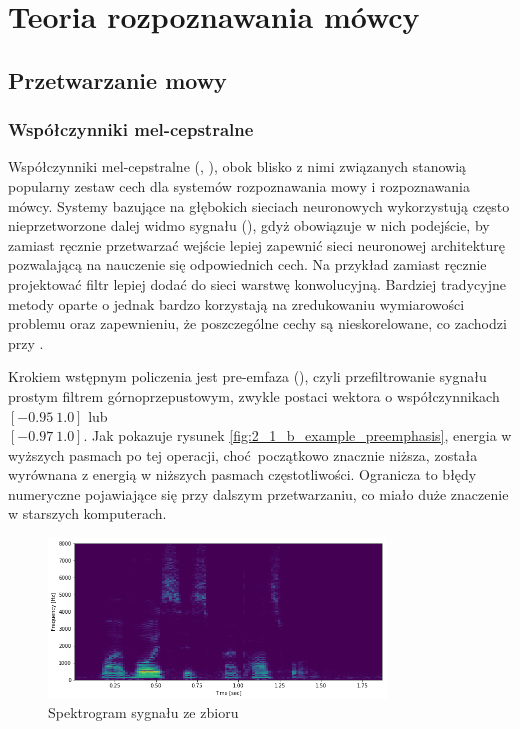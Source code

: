 \chapter{Teoria rozpoznawania mówcy}\label{chap:teoria}

\section{Przetwarzanie mowy}\label{sec:przetwarzanie_mowy}

\subsection{Współczynniki mel-cepstralne}\label{sec:mfcc}

Współczynniki mel-cepstralne (, ),
obok blisko z nimi związanych  stanowią popularny zestaw
cech dla systemów rozpoznawania mowy i rozpoznawania mówcy. Systemy bazujące na głębokich sieciach
neuronowych wykorzystują często nieprzetworzone dalej widmo sygnału (), gdyż obowiązuje
w nich podejście, by zamiast ręcznie przetwarzać wejście lepiej zapewnić sieci neuronowej
architekturę pozwalającą na nauczenie się odpowiednich cech. Na przykład zamiast ręcznie
projektować filtr lepiej dodać do sieci warstwę konwolucyjną. Bardziej tradycyjne metody
oparte o  jednak bardzo korzystają na zredukowaniu wymiarowości problemu
oraz zapewnieniu, że poszczególne cechy są nieskorelowane, co zachodzi przy .

Krokiem wstępnym policzenia  jest pre-emfaza (), czyli przefiltrowanie sygnału
prostym filtrem górnoprzepustowym, zwykle postaci wektora o współczynnikach $[-0.95\ 1.0]$ lub \\ $[-0.97\ 1.0]$.
Jak pokazuje rysunek \ref{fig:2_1_b_example_preemphasis}, energia w wyższych pasmach po tej operacji,
choć początkowo znacznie niższa, została wyrównana z energią w niższych pasmach częstotliwości.
Ogranicza to błędy numeryczne
pojawiające się przy dalszym przetwarzaniu, co miało duże znaczenie w starszych komputerach.

\begin{figure}[H]
    \centering
    \includegraphics[width=0.8\textwidth]{images/2_1_a_example_spectrogram}
    \caption{Spektrogram sygnału  ze zbioru }
    \label{fig:2_1_a_example_spectrogram}
\end{figure}

